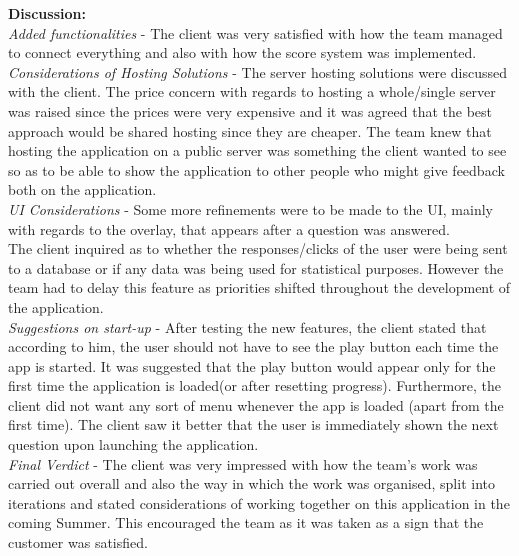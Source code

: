 \documentclass[paper=a4,fontsize=11pt]{article}
\begin{document}
\noindent
\textbf{Discussion:}\\
\noindent
\textit{Added functionalities} -
The client was very satisfied with how the team managed to connect everything and also with
how the score system was implemented.\\

\noindent
\textit{Considerations of Hosting Solutions} -
The server hosting solutions were discussed with the client. The price concern with regards to
hosting a whole/single server was raised since the prices were very expensive and it was
agreed that the best approach would be shared hosting since they are cheaper. The team knew that
hosting the application on a public server was something the client wanted to see so as to be able to
show the application to other people who might give feedback both on the application.\\

\noindent
\textit{UI Considerations} -
Some more refinements were to be made to the UI, mainly with regards to the overlay, that
appears after a question was answered.\\
\noindent
The client inquired as to whether the responses/clicks of the user were being sent to a
database or if any data was being used for statistical purposes. However the team had to delay this feature
as priorities shifted throughout the development of the application.\\

\noindent
\textit{Suggestions on start-up} -
After testing the new features, the client stated that according
to him, the user should not have to see the play button each time the app is started.
It was suggested that the play button would
appear only for the first time the application is loaded(or after resetting progress). Furthermore, the client
did not want any sort of menu whenever the app is loaded (apart from the first time). The client saw it better
that the user is immediately shown the next question upon launching the application.\\

\noindent
\textit{Final Verdict} -
The client was very impressed with how the team's work was
carried out overall and also the way in which the work was organised, split into iterations
and stated considerations of working together on this application in the coming Summer.
This encouraged the team as it was taken as a sign that the customer was satisfied.\\\\
\end{document}
